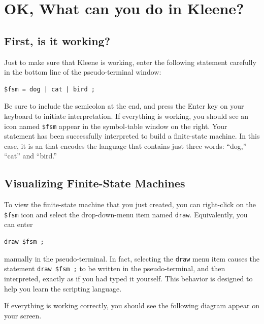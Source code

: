 \section{OK, What can you do in Kleene?}

\subsection{First, is it working?}

Just to make sure that Kleene is working, enter the following statement carefully in the bottom line of the
pseudo-terminal window:

\begin{Verbatim}
$fsm = dog | cat | bird ;
\end{Verbatim}

\noindent
Be sure to include the semicolon at the end, and press the Enter key on your keyboard to
initiate interpretation.  If everything is working, you should see an icon named
\verb!$fsm!
appear in the symbol-table window on the right.  Your statement has 
been successfully interpreted to
build a finite-state machine.  In this case, it is an \fsm{} that encodes the
language that contains just three words:  ``dog,'' ``cat'' and ``bird.''

\subsection{Visualizing Finite-State Machines}

To view the finite-state machine that you just created, you can right-click on the \verb!$fsm! icon and
select the drop-down-menu item
named \texttt{draw}.  Equivalently, you can enter 


\begin{Verbatim}
draw $fsm ;
\end{Verbatim}

\noindent
manually in the pseudo-terminal.  In fact, selecting the \texttt{draw} menu
item causes the statement \verb!draw $fsm ;! to be written in the
pseudo-terminal, and then interpreted, exactly as if you had typed it yourself.  This
behavior is designed to help you learn the scripting language.

If everything is working correctly, you should see the following \fsm{}
diagram appear on your screen.



